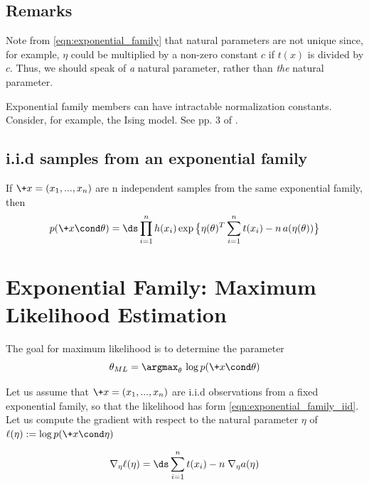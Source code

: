 \documentclass{article} %
\begin{document}
\subsection{Remarks}
\begin{remark}{}
\label{rk:nonuniqueness_of_natural_parameter}
Note from \eqref{eqn:exponential_family} that natural parameters are not unique since,  for example,  $\eta$ could be multiplied by a non-zero constant $c$ if $t(x)$ is divided by $c$.  Thus,  we should speak of \textit{a} natural parameter,  rather than \textit{the} natural parameter.
\end{remark}

\begin{remark}
Exponential family members can have intractable normalization constants.  Consider, for example,  the Ising model.  See pp. 3 of \cite{taylorXXXXmultiparameter}.
\end{remark}


\subsection{i.i.d samples from an exponential family}
If $\+x=(x_1, ..., x_n)$ are n independent samples from the same exponential family, then 
\begin{align}
\label{eqn:exponential_family_iid}
 p(\+x \cond \theta) = \ds\prod_{i=1}^n h(x_i) \exp \big\{ \eta(\theta)^T \sum_{i=1}^n t(x_i) - n \,a(\eta(\theta))\big\} 
 \end{align}

\section{Exponential Family: Maximum Likelihood Estimation} \label{sec:ml_with_ef}

The goal for maximum likelihood is to determine the parameter
\begin{equation}
\label{eqn:ml}
\theta_{ML} = \argmax_\theta  \, \log p(\+x \cond \theta) 
\end{equation}

Let us assume that $\+x=(x_1, ..., x_n)$ are i.i.d observations  from a fixed exponential family, so that the likelihood has form \eqref{eqn:exponential_family_iid}.  Let us compute the gradient with respect to the natural parameter $\eta$ of $\ell(\eta) := \log p(\+x \cond \eta)$

\[ \nabla_\eta \ell(\eta) = \ds\sum_{i=1}^n t(x_i) - n \; \nabla_\eta a(\eta) \]
\end{document}
